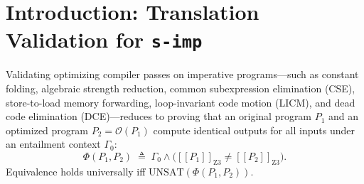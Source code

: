 \documentclass[11pt,a4paper]{article}
\newcommand{\sem}[1]{[\![#1]\!]}
\begin{document}
\newpage
\tableofcontents
\newpage

\section{Introduction: Translation Validation for \texttt{s-imp}}
\label{sec:intro}

Validating optimizing compiler passes on imperative programs---such as constant folding, algebraic strength reduction, common subexpression elimination (CSE), store-to-load memory forwarding, loop-invariant code motion (LICM), and dead code elimination (DCE)---reduces to proving that an original program $P_1$ and an optimized program $P_2 = \mathcal{O}(P_1)$ compute identical outputs for all inputs under an entailment context $\Gamma_0$:
\begin{equation}
  \Phi(P_1, P_2) \;\triangleq\; \Gamma_0 \wedge \big(\sem{P_1}_{\text{Z3}} \neq \sem{P_2}_{\text{Z3}}\big).
\end{equation}
Equivalence holds universally iff $\mathrm{UNSAT}(\Phi(P_1, P_2))$.
\end{document}
